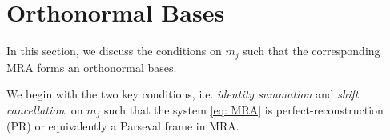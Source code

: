 \section{Orthonormal Bases}\label{sec: orth}

In this section, we discuss the conditions on $m_j$ such that the corresponding MRA forms an orthonormal bases. 

We begin with the two key conditions, i.e. {\it identity summation} and {\it shift cancellation}, on $m_j$ such that the system \eqref{eq: MRA} is perfect-reconstruction (PR) or equivalently a Parseval frame in MRA.%

